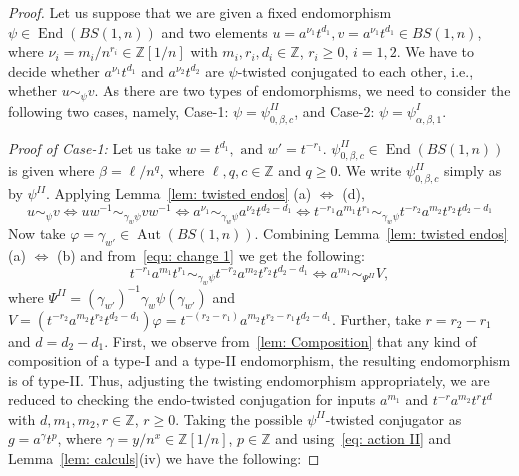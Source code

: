 \documentclass[10pt,a4paper]{amsart}
\newcommand{\Aut}{\operatorname{Aut}}
\newcommand{\End}{\operatorname{End}}
\newcommand\ZZ{\mathbb{Z}}
\begin{document}
\begin{proof}
    Let us suppose that we are given a fixed endomorphism $\psi \in \End (BS(1,n))$ and two elements $u = a^{\nu_1}t^{d_1}, v = a^{\nu_1}t^{d_1} \in BS(1, n)$, where $\nu_i =m_i/n^{r_i}\in \ZZ[1/n]$ with $m_i, r_i, d_i\in \ZZ$, $r_i\geq 0$, $i=1,2$. We have to decide whether $a^{\nu_1}t^{d_1}$ and $a^{\nu_2}t^{d_2}$ are $\psi$-twisted conjugated to each other, i.e., whether $u\sim_\psi v$. As there are two types of endomorphisms, we need to consider the following two cases, namely, Case-1: $\psi = \psi^{II}_{0, \beta, c}$, and Case-2: $\psi = \psi^{I}_{\alpha, \beta, 1}$.

    \noindent
    \textit{Proof of Case-1:} Let us take $w=t^{d_1}, \text{ and } w'=t^{-r_1}$. $\psi^{II}_{0, \beta, c}\in \End(BS(1,n))$ is given where $\beta = \ell/n^q$, where $\ell, q, c \in \ZZ$ and $q \geq 0$. We write $\psi^{II}_{0, \beta, c}$ simply as by $\psi^{II}$. Applying Lemma~\ref{lem: twisted endos} (a) $\Leftrightarrow$ (d), 
    \begin{equation}\label{equ: change 1}
        u \sim_{\psi} v \Leftrightarrow uw^{-1} \sim_{\gamma_w\psi} vw^{-1} \Leftrightarrow a^{\nu_1} \sim_{\gamma_w\psi} a^{\nu_2} t^{d_2 - d_1} \Leftrightarrow t^{-r_1} a^{m_1} t^{r_1}  \sim_{\gamma_w\psi} t^{-r_2} a^{m_2} t^{r_2}t^{d_2 - d_1}
    \end{equation}
   Now take $\varphi = \gamma_{w'} \in \Aut(BS(1,n))$. Combining Lemma~\ref{lem: twisted endos} (a) $\Leftrightarrow$ (b) and from~\eqref{equ: change 1} we get the following:
   \begin{equation}
       t^{-r_1} a^{m_1} t^{r_1}  \sim_{\gamma_w\psi} t^{-r_2} a^{m_2} t^{r_2}t^{d_2 - d_1} \Leftrightarrow a^{m_1} \sim_{\Psi^{II}} V,
   \end{equation}
%
where $\Psi^{II} = (\gamma_{w'})^{-1}\gamma_w\psi (\gamma_{w'})$ and $V = (t^{-r_2} a^{m_2} t^{r_2}t^{d_2 - d_1})\varphi = t^{-(r_2 - r_1)}a^{m_2} t^{r_2 - r_1} t^{d_2 - d_1}$. Further, take $r = r_2 - r_1$ and $d = d_2 - d_1$. First, we observe from~\ref{lem: Composition} that any kind of composition of a type-I and a type-II endomorphism, the resulting endomorphism is of type-II.
Thus, adjusting the twisting endomorphism appropriately, we are reduced to checking the endo-twisted conjugation for inputs $a^{m_1}$ and $t^{-r} a^{m_2} t^r t^d$ with $d, m_1, m_2, r \in \ZZ$, $r \geq 0$. Taking the possible $\psi^{II}$-twisted conjugator as $g = a^{\gamma}t^p$, where $\gamma = y/n^x \in \ZZ[1/n]$, $p \in \ZZ$ and using~\eqref{eq: action II} and Lemma~\ref{lem: calculs}(iv) we have the following:

\end{proof}
\end{document}
